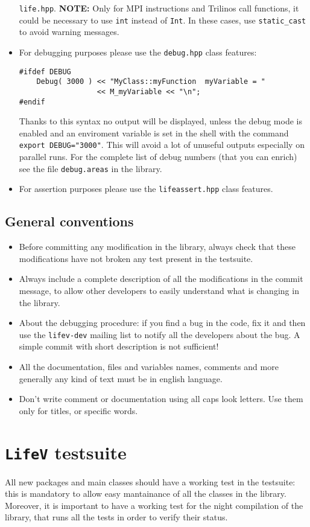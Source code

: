 \documentclass[a4paper]{article}
\begin{document}
\begin{itemize}
  \texttt{life.hpp}. \newline \textbf{NOTE:} Only for MPI instructions and
  Trilinos call functions, it could be necessary to use \texttt{int} instead of \texttt{Int}.
  In these cases, use \texttt{static\_cast} to avoid warning messages.
  \item For debugging purposes please use the \texttt{debug.hpp} class features:
\begin{lstlisting}
#ifdef DEBUG
    Debug( 3000 ) << "MyClass::myFunction  myVariable = " 
                  << M_myVariable << "\n"; 
#endif
\end{lstlisting}
  Thanks to this syntax no output will be displayed, unless the debug
  mode is enabled and an enviroment variable is set in the shell with the
  command \texttt{export DEBUG="3000"}. This will avoid a lot of unuseful
  outputs especially on parallel runs. For the complete list of debug numbers
  (that you can enrich) see the file \texttt{debug.areas} in the library.
  \item For assertion purposes please use the \texttt{lifeassert.hpp} class
  features.
\end{itemize}

\subsection{General conventions}
\begin{itemize}
  \item Before committing any modification in the library, always check
  that these modifications have not broken any test present in the
  testsuite.
  \item Always include a complete description of all the modifications in the
  commit message, to allow other developers to easily understand what is
  changing in the library.
  \item About the debugging procedure: if you find a bug in the code, fix it
  and then use the \texttt{lifev-dev} mailing list to notify all the developers
  about the bug. A simple commit with short description is not sufficient!
  \item All the documentation, files and variables names, comments and more
  generally any kind of text must be in english language.
  \item Don't write comment or documentation using all caps look letters. Use
  them only for titles, or specific words.
\end{itemize}

\section{\texttt{LifeV} testsuite} \label{testsuite}
All new packages and main classes should have a working test in the testsuite:
this is mandatory to allow easy mantainance of all the classes in the
library. Moreover, it is important to have a working test for the night
compilation of the library, that runs all the tests in order to verify their
status.
\end{document}
